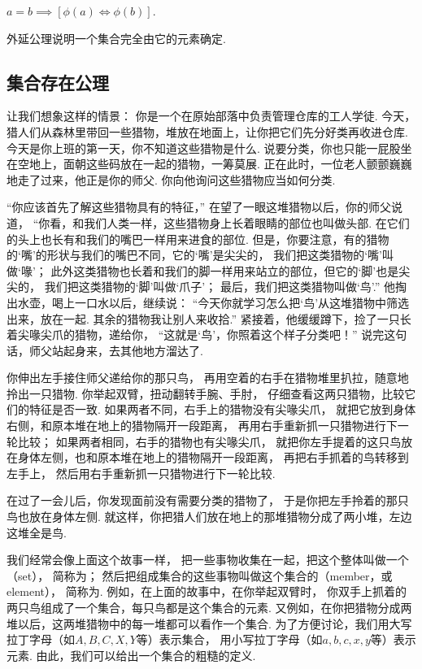 \begin{theorem}
\(a=b \implies [\phi(a)\iff\phi(b)]\).
\end{theorem}

外延公理说明一个集合完全由它的元素确定.


\subsection{集合存在公理}
让我们想象这样的情景：
你是一个在原始部落中负责管理仓库的工人学徒.
今天，猎人们从森林里带回一些猎物，堆放在地面上，让你把它们先分好类再收进仓库.
今天是你上班的第一天，你不知道这些猎物是什么.
说要分类，你也只能一屁股坐在空地上，面朝这些码放在一起的猎物，一筹莫展.
正在此时，一位老人颤颤巍巍地走了过来，他正是你的师父.
你向他询问这些猎物应当如何分类.

“你应该首先了解这些猎物具有的特征，”
在望了一眼这堆猎物以后，你的师父说道，
“你看，和我们人类一样，这些猎物身上长着眼睛的部位也叫做头部.
在它们的头上也长有和我们的嘴巴一样用来进食的部位.
但是，你要注意，有的猎物的‘嘴’的形状与我们的嘴巴不同，它的‘嘴’是尖尖的，
我们把这类猎物的‘嘴’叫做‘喙’；
此外这类猎物也长着和我们的脚一样用来站立的部位，但它的‘脚’也是尖尖的，
我们把这类猎物的‘脚’叫做‘爪子’；
最后，我们把这类猎物叫做‘鸟’.”
他掏出水壶，喝上一口水以后，继续说：
“今天你就学习怎么把‘鸟’从这堆猎物中筛选出来，放在一起.
其余的猎物我让别人来收拾.”
紧接着，他缓缓蹲下，捡了一只长着尖喙尖爪的猎物，递给你，
“这就是‘鸟’，你照着这个样子分类吧！”
说完这句话，师父站起身来，去其他地方溜达了.

你伸出左手接住师父递给你的那只鸟，
再用空着的右手在猎物堆里扒拉，随意地拎出一只猎物.
你举起双臂，扭动翻转手腕、手肘，
仔细查看这两只猎物，比较它们的特征是否一致.
如果两者不同，右手上的猎物没有尖喙尖爪，
就把它放到身体右侧，和原本堆在地上的猎物隔开一段距离，
再用右手重新抓一只猎物进行下一轮比较；
如果两者相同，右手的猎物也有尖喙尖爪，
就把你左手提着的这只鸟放在身体左侧，也和原本堆在地上的猎物隔开一段距离，
再把右手抓着的鸟转移到左手上，
然后用右手重新抓一只猎物进行下一轮比较.

在过了一会儿后，你发现面前没有需要分类的猎物了，
于是你把左手拎着的那只鸟也放在身体左侧.
就这样，你把猎人们放在地上的那堆猎物分成了两小堆，左边这堆全是鸟.


我们经常会像上面这个故事一样，
把一些事物收集在一起，把这个整体叫做一个（set），
简称为；
然后把组成集合的这些事物叫做这个集合的（member，或element），
简称为.
例如，在上面的故事中，在你举起双臂时，
你双手上抓着的两只鸟组成了一个集合，每只鸟都是这个集合的元素.
又例如，在你把猎物分成两堆以后，这两堆猎物中的每一堆都可以看作一个集合.
为了方便讨论，我们用大写拉丁字母（如\(A,B,C,X,Y\)等）表示集合，
用小写拉丁字母（如\(a,b,c,x,y\)等）表示元素.
由此，我们可以给出一个集合的粗糙的定义.

